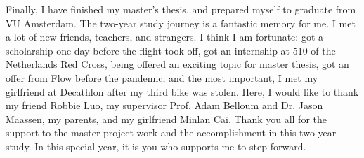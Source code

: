 

\begin{acknowledgements}      %

    Finally, I have finished my master’s thesis, and prepared myself to graduate from VU Amsterdam. 
    The two-year study journey is a fantastic memory for me. 
    I met a lot of new friends, teachers, and strangers. I think I am fortunate: got a scholarship one day before the flight took off, got an internship at 510 of the Netherlands Red Cross, being offered an exciting topic for master thesis, got an offer from Flow before the pandemic, and the most important, I met my girlfriend at Decathlon after my third bike was stolen. 
    Here, I would like to thank my friend Robbie Luo, my supervisor Prof. Adam Belloum and Dr. Jason Maassen, my parents, and my girlfriend Minlan Cai. 
    Thank you all for the support to the master project work and the accomplishment in this two-year study. In this special year, it is you who supports me to step forward.
\end{acknowledgements}




